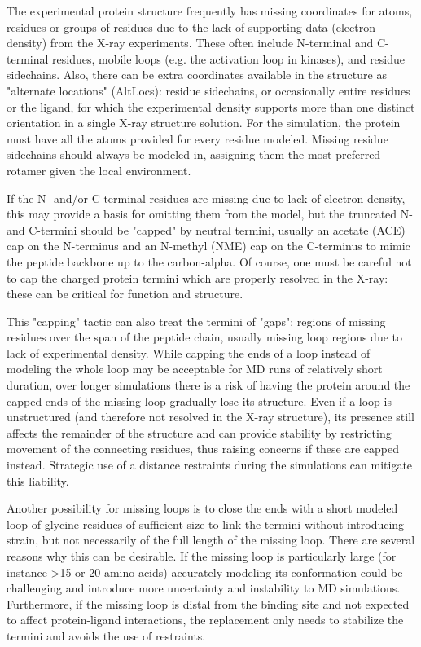\documentclass[9pt,bestpractices,pubversion]{livecoms}
\begin{document}
The experimental protein structure frequently has missing coordinates for atoms, residues or groups of residues due to the lack of supporting data (electron density) from the X-ray experiments. These often include N-terminal and C-terminal residues, mobile loops (e.g. the activation loop in kinases), and residue sidechains. Also, there can be extra coordinates available in the structure as "alternate locations" (AltLocs): residue sidechains, or occasionally entire residues or the ligand, for which the experimental density supports more than one distinct orientation in a single X-ray structure solution. For the simulation, the protein must have all the atoms provided for every residue modeled. Missing residue sidechains should always be modeled in, assigning them the most preferred rotamer given the local environment. 

If the N- and/or C-terminal residues are missing due to lack of electron density, this may provide a basis for omitting them from the model, but the truncated N- and C-termini should be "capped" by neutral termini, usually an acetate (ACE) cap on the N-terminus and an N-methyl (NME) cap on the C-terminus to mimic the peptide backbone up to the carbon-alpha. Of course, one must be careful not to cap the charged protein termini which are properly resolved in the X-ray: these can be critical for function and structure. 

This "capping" tactic can also treat the termini of "gaps": regions of missing residues over the span of the peptide chain, usually missing loop regions due to lack of experimental density. While capping the ends of a loop instead of modeling the whole loop may be acceptable for MD runs of relatively short duration, over longer simulations there is a risk of having the protein around the capped ends of the missing loop gradually lose its structure. Even if a loop is unstructured (and therefore not resolved in the X-ray structure), its presence still affects the remainder of the structure and can provide stability by restricting movement of the connecting residues, thus raising concerns if these are capped instead. Strategic use of a distance restraints during the simulations can mitigate this liability.

Another possibility for missing loops is to close the ends with a short modeled loop of glycine residues of sufficient size to link the termini without introducing strain, but not necessarily of the full length of the missing loop. There are several reasons why this can be desirable. If the missing loop is particularly large (for instance >15 or 20 amino acids) accurately modeling its conformation could be challenging and introduce more uncertainty and instability to MD simulations. Furthermore, if the missing loop is distal from the binding site and not expected to affect protein-ligand interactions, the replacement only needs to stabilize the termini and avoids the use of restraints. 
\end{document}

